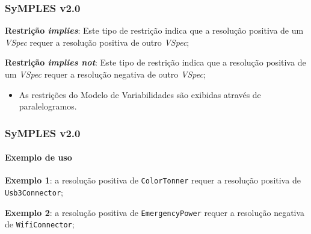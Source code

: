 \begin{frame}
\frametitle{SyMPLES v2.0}

  \textbf{Restrição \textit{implies}}: Este tipo de restrição indica que a resolução positiva de um \textit{VSpec} requer a resolução positiva de outro \textit{VSpec};
  
  \textbf{Restrição \textit{implies not}}: Este tipo de restrição indica que a resolução positiva de um \textit{VSpec} requer a resolução negativa de outro \textit{VSpec};
  
  \begin{itemize}
    \item {
      As restrições do Modelo de Variabilidades são exibidas através de paralelogramos.
    }
  \end{itemize}

\end{frame}


\begin{frame}
\frametitle{SyMPLES v2.0}
\framesubtitle{Exemplo de uso}
  
  \textbf{Exemplo 1}: a resolução positiva de \texttt{ColorTonner} requer a resolução positiva de \texttt{Usb3Connector};
  
  \textbf{Exemplo 2}: a resolução positiva de \texttt{EmergencyPower} requer a resolução negativa de \texttt{WifiConnector};

  \begin{figure}
  \end{figure}

\end{frame}
